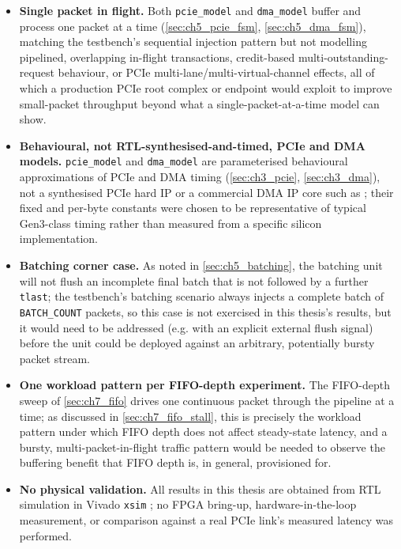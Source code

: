 \begin{itemize}
    \item \textbf{Single packet in flight.} Both \texttt{pcie\_model} and \texttt{dma\_model} buffer and process one packet at a time (\autoref{sec:ch5_pcie_fsm}, \autoref{sec:ch5_dma_fsm}), matching the testbench's sequential injection pattern but not modelling pipelined, overlapping in-flight transactions, credit-based multi-outstanding-request behaviour, or PCIe multi-lane/multi-virtual-channel effects, all of which a production PCIe root complex or endpoint would exploit to improve small-packet throughput beyond what a single-packet-at-a-time model can show.
    \item \textbf{Behavioural, not RTL-synthesised-and-timed, PCIe and DMA models.} \texttt{pcie\_model} and \texttt{dma\_model} are parameterised behavioural approximations of PCIe and DMA timing (\autoref{sec:ch3_pcie}, \autoref{sec:ch3_dma}), not a synthesised PCIe hard IP or a commercial DMA IP core such as \cite{xilinx2021axidma, xilinx2021pcieintblock}; their fixed and per-byte constants were chosen to be representative of typical Gen3-class timing rather than measured from a specific silicon implementation.
    \item \textbf{Batching corner case.} As noted in \autoref{sec:ch5_batching}, the batching unit will not flush an incomplete final batch that is not followed by a further \texttt{tlast}; the testbench's batching scenario always injects a complete batch of \texttt{BATCH\_COUNT} packets, so this case is not exercised in this thesis's results, but it would need to be addressed (e.g. with an explicit external flush signal) before the unit could be deployed against an arbitrary, potentially bursty packet stream.
    \item \textbf{One workload pattern per FIFO-depth experiment.} The FIFO-depth sweep of \autoref{sec:ch7_fifo} drives one continuous packet through the pipeline at a time; as discussed in \autoref{sec:ch7_fifo_stall}, this is precisely the workload pattern under which FIFO depth does not affect steady-state latency, and a bursty, multi-packet-in-flight traffic pattern would be needed to observe the buffering benefit that FIFO depth is, in general, provisioned for.
    \item \textbf{No physical validation.} All results in this thesis are obtained from RTL simulation in Vivado \texttt{xsim} \cite{xilinx2022vivadosim}; no FPGA bring-up, hardware-in-the-loop measurement, or comparison against a real PCIe link's measured latency was performed.
\end{itemize}

